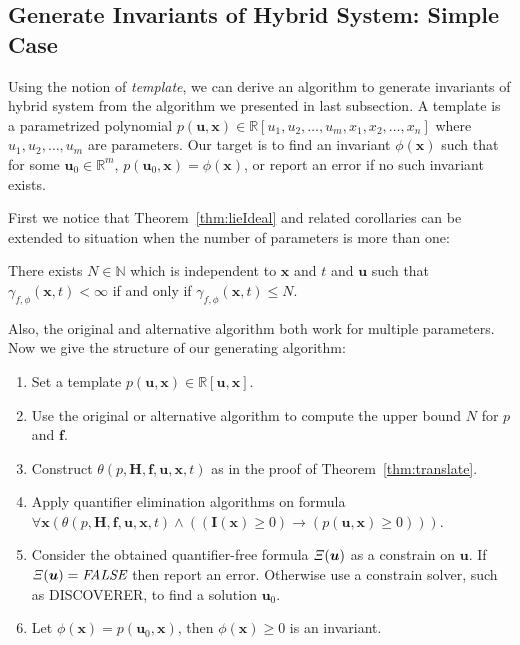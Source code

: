 \documentclass{jssc}
\begin{document}
\subsection{Generate Invariants of Hybrid System: Simple Case}
Using the notion of \emph{template}, we can derive an algorithm to generate invariants of hybrid system from the algorithm we presented in last subsection. A template is a parametrized polynomial $p(\boldsymbol{u}, \boldsymbol{x}) \in \mathbb{R}[u_1, u_2, \dots, u_m, x_1, x_2, \dots, x_n]$ where $u_1, u_2, \dots, u_m$ are parameters. Our target is to find an invariant $\phi(\boldsymbol{x})$ such that for some $\boldsymbol{u}_0 \in \mathbb{R}^m$, $p(\boldsymbol{u}_0, \boldsymbol{x}) = \phi(\boldsymbol{x})$, or report an error if no such invariant exists.

First we notice that Theorem~\ref{thm:lieIdeal} and related corollaries can be extended to situation when the number of parameters is more than one:
\begin{lemma}
\label{cor:paraLieRank}
There exists $N \in \mathbb{N}$ which is independent to $\boldsymbol{x}$ and $t$ and $\boldsymbol{u}$ such that $\gamma_{f, \phi}(\boldsymbol{x}, t) < \infty$ if and only if $\gamma_{f, \phi}(\boldsymbol{x}, t) \leq N$.
\end{lemma}
Also, the original and alternative algorithm both work for multiple parameters. Now we give the structure of our generating algorithm:
\begin{enumerate}
	\item Set a template $p(\boldsymbol{u}, \boldsymbol{x}) \in \mathbb{R}[\boldsymbol{u},\boldsymbol{x}]$.
	\item Use the original or alternative algorithm to compute the upper bound $N$ for $p$ and $\boldsymbol{f}$.
	\item Construct $\theta(p ,\boldsymbol{H}, \boldsymbol{f},\boldsymbol{u}, \boldsymbol{x}, t)$ as in the proof of Theorem~\ref{thm:translate}.
	\item Apply quantifier elimination algorithms on formula $\forall \boldsymbol{x} (\theta(p, \boldsymbol{H}, \boldsymbol{f}, \boldsymbol{u}, \boldsymbol{x}, t) \wedge ((\boldsymbol{I}(\boldsymbol{x}) \geq 0) \rightarrow (p(\boldsymbol{u}, \boldsymbol{x}) \geq 0)))$.
	\item Consider the obtained quantifier-free formula ${\it \Xi}(\boldsymbol{u})$ as a constrain on $\boldsymbol{u}$. If ${\it \Xi}(\boldsymbol{u}) = \textit{FALSE}$ then report an error. Otherwise use a constrain solver, such as DISCOVERER\cite{xia2007discoverer}, to find a solution $\boldsymbol{u}_0$.
	\item Let $\phi(\boldsymbol{x}) = p(\boldsymbol{u}_0, \boldsymbol{x})$, then $\phi(\boldsymbol{x}) \geq 0$ is an invariant.
\end{enumerate}
\end{document}
